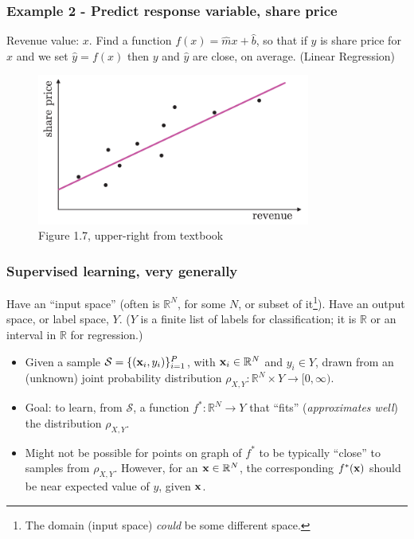 \documentclass{beamer}
\theoremstyle{example}
\newcommand{\bb}[1]{\mathbb{#1}}
\begin{document}
\begin{frame}
    \frametitle{Example 2 - Predict response variable, share price}
    Revenue value: $x$.  Find a function $f(x) = \hat{m}x + \hat{b}$, so that if $y$ is share price for $x$ and we set $\hat{y} = f(x)$ then $y$ and $\hat{y}$ are close, on average. (Linear Regression)

    \begin{figure}
        \includegraphics[width=0.8\textwidth]{../../Images/Fig1-7b.png}
    \caption*{Figure 1.7, upper-right from textbook}
    \end{figure}
\end{frame}

\begin{frame}
\frametitle{Supervised learning, very generally}
Have an ``input space'' (often is $\mathbb R^{N}$, for some $N$, or subset of it\footnote{The domain (input space) \textit{could} be some different space.}).  Have an output space, or label space, $Y$. ($Y$ is a finite list of labels for classification; it is $\bb R$ or an interval in $\bb R$ for regression.) 

\pause
\begin{itemize}
    \item Given a sample $\mathcal S = \{({\bf x}_i, y_i)\}_{i=1}^P$, with ${\bf x}_i\in\mathbb R^N$ and $y_i\in Y$, drawn from an (unknown) joint probability distribution $\rho_{X,Y}:\mathbb R^{N}\times Y \to [0, \infty)$. 
    \pause
    \item Goal: to learn, from $\mathcal S$, a function $f^*:\mathbb R^N\to Y$ that ``fits'' (\textit{approximates well}) the distribution $\rho_{X,Y}$. 
    \pause
    \item Might not be possible for points on graph of $f^*$ to be typically ``close'' to samples from $\rho_{X,Y}$. However, for an ${\bf x}\in\mathbb R^N$, the corresponding $f^*(\bf x)$ should be near expected value of $y$, given ${\bf x}$.
\end{itemize}

\end{frame}
\end{document}
